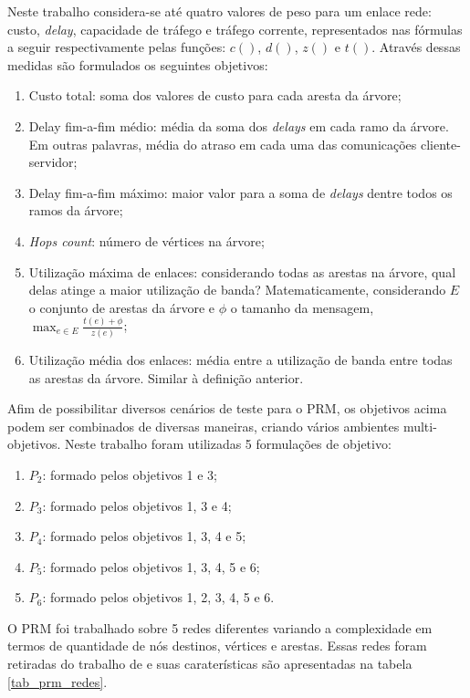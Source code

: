 Neste trabalho considera-se até quatro valores de peso para um enlace rede: custo, \textit{delay}, capacidade de tráfego e tráfego corrente, representados nas fórmulas a seguir respectivamente pelas funções: $c()$, $d()$, $z()$ e $t()$. Através dessas medidas são formulados os seguintes objetivos:

\begin{enumerate} 
	\item Custo total: soma dos valores de custo para cada aresta da árvore;
	\item Delay fim-a-fim médio: média da soma dos \textit{delays} em cada ramo da árvore. Em outras palavras, média do atraso em cada uma das comunicações cliente-servidor;
	\item Delay fim-a-fim máximo: maior valor para a soma de \textit{delays} dentre todos os ramos da árvore;
	\item \textit{Hops count}: número de vértices na árvore;
	\item Utilização máxima de enlaces: considerando todas as arestas na árvore, qual delas atinge a maior utilização de banda? Matematicamente, considerando $E$ o conjunto de arestas da árvore e $\phi$ o tamanho da mensagem, $\max_{e \in E} \frac{t(e) + \phi}{z(e)}$;
	\item Utilização média dos enlaces: média entre a utilização de banda entre todas as arestas da árvore. Similar à definição anterior.
\end{enumerate}

Afim de possibilitar diversos cenários de teste para o PRM, os objetivos acima podem ser combinados de diversas maneiras, criando vários ambientes multi-objetivos. Neste trabalho foram utilizadas 5 formulações de objetivo:

\begin{enumerate}
	\item $P_2$: formado pelos objetivos 1 e 3;
	\item $P_3$: formado pelos objetivos 1, 3 e 4;
	\item $P_4$: formado pelos objetivos 1, 3, 4 e 5;
	\item $P_5$: formado pelos objetivos 1, 3, 4, 5 e 6;
	\item $P_6$: formado pelos objetivos 1, 2, 3, 4, 5 e 6.
\end{enumerate}

O PRM foi trabalhado sobre 5 redes diferentes variando a complexidade em termos de quantidade de nós destinos, vértices e arestas. Essas redes foram retiradas do trabalho de \cite{Lafeta2016} e suas caraterísticas são apresentadas na tabela \ref{tab_prm_redes}.

